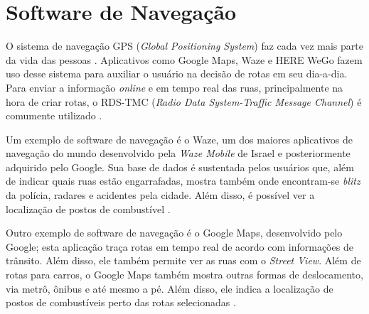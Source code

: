 \section{Software de Navegação}

O sistema de navegação GPS (\textit{Global Positioning System}) faz cada vez mais parte da vida das pessoas \cite{gps-1}. Aplicativos como Google Maps, Waze e HERE WeGo fazem uso desse sistema para auxiliar o usuário na decisão de rotas em seu dia-a-dia. Para enviar a informação \textit{online} e em tempo real das ruas, principalmente na hora de criar rotas, o RDS-TMC (\textit{Radio Data System-Traffic Message Channel}) é comumente utilizado \cite{rds-tmc}.

Um exemplo de software de navegação é o Waze, um dos maiores aplicativos de navegação do mundo desenvolvido pela \textit{Waze Mobile} de Israel e posteriormente adquirido pelo Google. Sua base de dados é sustentada pelos usuários que, além de indicar quais ruas estão engarrafadas, mostra também onde encontram-se \textit{blitz} da polícia, radares e acidentes pela cidade. Além disso, é possível ver a localização de postos de combustível \cite{waze}.

Outro exemplo de software de navegação é o Google Maps, desenvolvido pelo Google; esta aplicação traça rotas em tempo real de acordo com informações de trânsito. Além disso, ele também permite ver as ruas com o \textit{Street View}. Além de rotas para carros, o Google Maps também mostra outras formas de deslocamento, via metrô, ônibus e até mesmo a pé. Além disso, ele indica a localização de postos de combustíveis perto das rotas selecionadas \cite{google-maps}.
